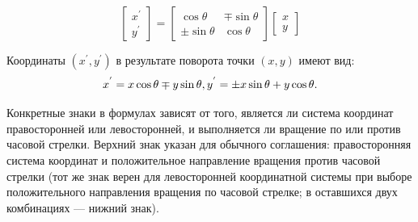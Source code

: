\documentclass{book}
\begin{document}
$$
\begin{bmatrix}
x^{'}\\
y^{'}
\end{bmatrix}
=
\begin{bmatrix}
\cos{\theta} & \mp\sin{\theta}\\
\pm\sin{\theta} & \cos{\theta}
\end{bmatrix}
\begin{bmatrix}
x\\
y
\end{bmatrix}
$$

Координаты $(x^{'},y^{'})$ в результате поворота точки $(x, y)$ имеют вид:
$$
x^{'}=x\cos{\theta}\mp y\sin{\theta},\\
y^{'}=\pm x\sin{\theta} + y\cos{\theta}.
$$

Конкретные знаки в формулах зависят от того, является ли система координат правосторонней или левосторонней, и выполняется ли вращение по или против часовой стрелки. Верхний знак указан для обычного соглашения: правосторонняя система координат и положительное направление вращения против часовой стрелки (тот же знак верен для левосторонней координатной системы при выборе положительного направления вращения по часовой стрелке; в оставшихся двух комбинациях — нижний знак).
\end{document}
